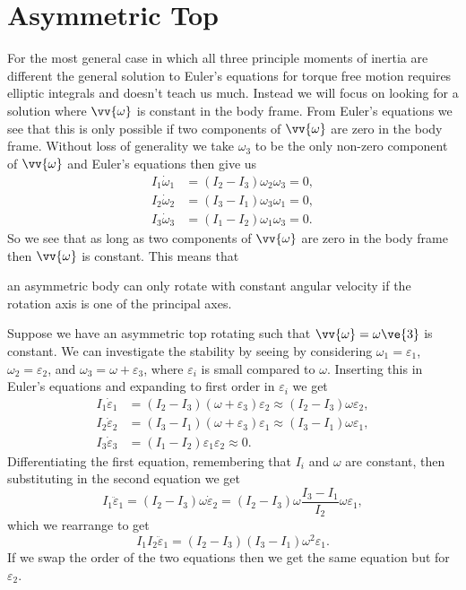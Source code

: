 \documentclass[fleqn]{NotesClass}
\begin{document}
    \section{Asymmetric Top}
    For the most general case in which all three principle moments of inertia are different the general solution to Euler's equations for torque free motion requires elliptic integrals and doesn't teach us much.
    Instead we will focus on looking for a solution where \(\vv{\omega}\) is constant in the body frame.
    From Euler's equations we see that this is only possible if two components of \(\vv{\omega}\) are zero in the body frame.
    Without loss of generality we take \(\omega_3\) to be the only non-zero component of \(\vv{\omega}\) and Euler's equations then give us
    \begin{align}
        I_1\dot{\omega}_1 &= (I_2 - I_3)\omega_2\omega_3 = 0,\\
        I_2\dot{\omega}_2 &= (I_3 - I_1)\omega_3\omega_1 = 0,\\
        I_3\dot{\omega}_3 &= (I_1 - I_2)\omega_1\omega_3 = 0.
    \end{align}
    So we see that as long as two components of \(\vv{\omega}\) are zero in the body frame then \(\vv{\omega}\) is constant.
    This means that
    \begin{important}
        an asymmetric body can only rotate with constant angular velocity if the rotation axis is one of the principal axes.
    \end{important}

    Suppose we have an asymmetric top rotating such that \(\vv{\omega} = \omega\ve{3}\) is constant.
    We can investigate the stability by seeing by considering \(\omega_1 = \varepsilon_1\), \(\omega_2 = \varepsilon_2\), and \(\omega_3 = \omega + \varepsilon_3\), where \(\varepsilon_i\) is small compared to \(\omega\).
    Inserting this in Euler's equations and expanding to first order in \(\varepsilon_i\) we get
    \begin{align}
        I_1\dot{\varepsilon}_1 &= (I_2 - I_3)(\omega + \varepsilon_3)\varepsilon_2 \approx (I_2 - I_3)\omega\varepsilon_2,\\
        I_2\dot{\varepsilon}_2 &= (I_3 - I_1)(\omega + \varepsilon_3)\varepsilon_1 \approx (I_3 - I_1)\omega\varepsilon_1,\\
        I_3\dot{\varepsilon}_3 &= (I_1 - I_2)\varepsilon_1\varepsilon_2 \approx 0.
    \end{align}
    Differentiating the first equation, remembering that \(I_i\) and \(\omega\) are constant, then substituting in the second equation we get
    \begin{equation}
        I_1\ddot{\varepsilon}_1 = (I_2 - I_3)\omega\dot{\varepsilon}_2 = (I_2 - I_3)\omega\frac{I_3 - I_1}{I_2}\omega\varepsilon_1,
    \end{equation}
    which we rearrange to get
    \begin{equation}
        I_1I_2\ddot{\varepsilon}_1 = (I_2 - I_3)(I_3 - I_1)\omega^2\varepsilon_1.
    \end{equation}
    If we swap the order of the two equations then we get the same equation but for \(\varepsilon_2\).
    
\end{document}
